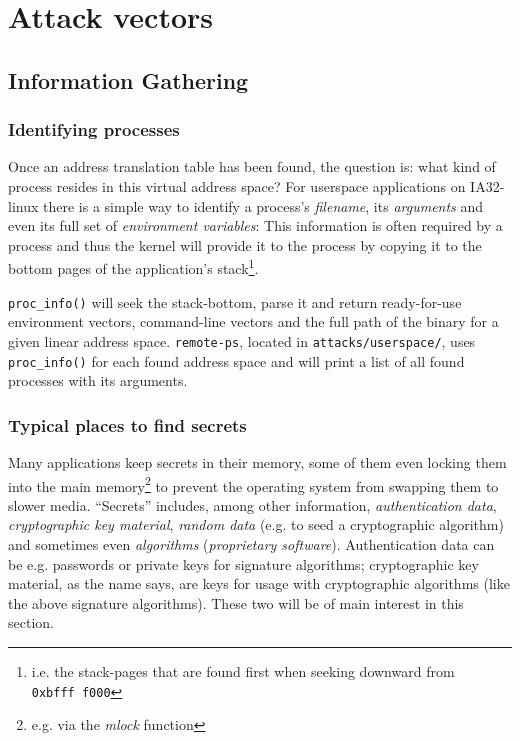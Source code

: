%
%

\section{Attack vectors}




\subsection{Information Gathering}

\subsubsection{Identifying processes}

Once an address translation table has been found, the question is: what kind of
process resides in this virtual address space?  For userspace applications on
IA32-linux there is a simple way to identify a process's \emph{filename}, its
\emph{arguments} and even its full set of \emph{environment variables}: This
information is often required by a process and thus the kernel will provide it
to the process by copying it to the bottom pages of the application's
stack\footnote{i.e.  the stack-pages that are found first when seeking downward
from \texttt{0xbfff~f000}}.

\texttt{proc\_info()} will seek the stack-bottom, parse it and return
ready-for-use environment vectors, command-line vectors and the full path of the
binary for a given linear address space. \texttt{remote-ps}, located in
\texttt{attacks/userspace/}, uses \texttt{proc\_info()} for each found address
space and will print a list of all found processes with its arguments.


\subsubsection{Typical places to find secrets}

Many applications keep secrets in their memory, some of them even locking them
into the main memory\footnote{e.g. via the \emph{mlock} function} to prevent the
operating system from swapping them to slower media. ``Secrets'' includes, among
other information, \emph{authentication data}, \emph{cryptographic key
material}, \emph{random data} (e.g. to seed a cryptographic algorithm) and
sometimes even \emph{algorithms} (\emph{proprietary software}). Authentication
data can be e.g.  passwords or private keys for signature algorithms;
cryptographic key material, as the name says, are keys for usage with
cryptographic algorithms (like the above signature algorithms). These two will
be of main interest in this section.

